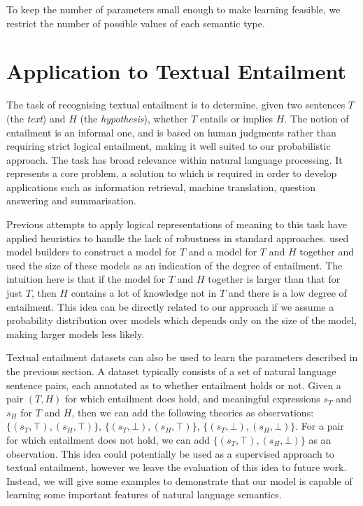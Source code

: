 \documentclass[letterpaper]{article}
\newcommand{\citet}[1]{\citeauthor{#1} \shortcite{#1}}
\begin{document}
To keep the number of parameters small enough to make learning
feasible, we restrict the number of possible values of each semantic
type.

\section{Application to Textual Entailment}

The task of recognising textual entailment \cite{Dagan:05} is to
determine, given two sentences $T$ (the \emph{text}) and $H$ (the
\emph{hypothesis}), whether $T$ entails or implies $H$. The notion of
entailment is an informal one, and is based on human judgments rather
than requiring strict logical entailment, making it well suited to our
probabilistic approach. The task has broad relevance within natural language processing. 
It represents a core problem, a solution to which is required in order to develop applications such as
information retrieval, machine translation, question answering and
summarisation.

Previous attempts to apply logical representations of meaning to this
task have applied heuristics to handle the lack of robustness in
standard approaches. \citet{Bos:06} used model builders to construct a
model for $T$ and a model for $T$ and $H$ together and used the size
of these models as an indication of the degree of entailment. The
intuition here is that if the model for $T$ and $H$ together is larger
than that for just $T$, then $H$ contains a lot of knowledge not in
$T$ and there is a low degree of entailment.  This idea can be
directly related to our approach if we assume a probability
distribution over models which depends only on the size of the model,
making larger models less likely.

Textual entailment datasets can also be used to learn the parameters
described in the previous section. A dataset typically consists of a
set of natural language sentence pairs, each annotated as to whether
entailment holds or not. Given a pair $(T,H)$ for which entailment
does hold, and meaningful expressions $s_T$ and $s_H$ for $T$ and $H$,
then we can add the following theories as observations:
$\{(s_T,\top),(s_H,\top)\}$, $\{(s_T,\bot),(s_H,\top)\}$,
$\{(s_T,\bot),(s_H,\bot)\}$. For a pair for which entailment does not
hold, we can add $\{(s_T,\top),(s_H,\bot)\}$ as an observation. This
idea could potentially be used as a supervised approach to textual
entailment, however we leave the evaluation of this idea to future
work. Instead, we will give some examples to demonstrate that our
model is capable of learning some important features of natural
language semantics.
\end{document}
